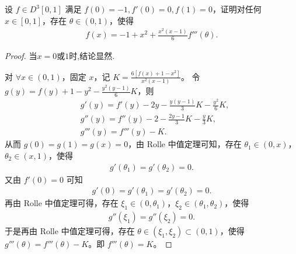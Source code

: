 \documentclass[../../main.tex]{subfiles}%
\begin{document}
\begin{example}
设 $f \in D^3[0,1]$ 满足 $f(0) = -1, f'(0) = 0, f(1) = 0$，证明对任何 $x \in [0,1]$，存在 $\theta \in (0,1)$，使得
\begin{align*}
f(x) = -1 + x^2 + \frac{x^2 (x - 1)}{6} f'''(\theta).
\end{align*}
\end{example}
\begin{proof}
当$x=0$或$1$时,结论显然.

对 $\forall x\in (0,1)$，固定 $x$，记 $K=\frac{6[f(x) +1-x^2]}{x^2(x-1)}$。
令 $g(y) =f(y) +1-y^2-\frac{y^2(y-1)}{6}K$，则
\begin{align*}
&g'(y) =f'(y) -2y-\frac{y(y-1)}{3}K-\frac{y^2}{6}K, \\
&g''(y) =f''(y) -2-\frac{2y-1}{3}K-\frac{y}{3}K, \\
&g'''(y) =f'''(y) -K.
\end{align*}
从而 $g(0) =g(1) =g(x) =0$，由 Rolle 中值定理可知，存在 $\theta_1\in (0,x)$，$\theta_2\in (x,1)$，使得
\begin{align*}
g'(\theta_1) =g'(\theta_2) =0.
\end{align*}
又由 $f'(0) =0$ 可知
\begin{align*}
g'(0) =g'(\theta_1) =g'(\theta_2) =0.
\end{align*}
再由 Rolle 中值定理可得，存在 $\xi_1\in (0,\theta_1)$，$\xi_2\in (\theta_1,\theta_2)$，使得
\begin{align*}
g''(\xi_1) =g''(\xi_2) =0.
\end{align*}
于是再由 Rolle 中值定理可得，存在 $\theta \in (\xi_1,\xi_2) \subset (0,1)$，使得 $g'''(\theta) =f'''(\theta) -K$。即 $f'''(\theta) =K$。
\end{proof}
\end{document}
